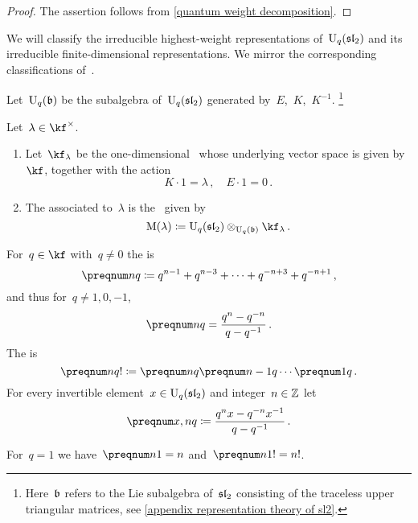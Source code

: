 \documentclass[a4paper, 11pt, oneside]{scrartcl}
\begin{document}
\begin{proof}
  The assertion follows from \cref{quantum weight decomposition}.
\end{proof}

We will classify the irreducible highest-weight representations of~$\operatorname{U}_q(\mathfrak{sl}_2)$ and its irreducible finite-dimensional representations.
We mirror the corresponding classifications of~.

\begin{definition}
  Let~$\operatorname{U}_q(\mathfrak{b})$ be the subalgebra of~$\operatorname{U}_q(\mathfrak{sl}_2)$ generated by~$E$,~$K$,~$K^{-1}$.%
  \footnote{
    Here~$\mathfrak{b}$ refers to the Lie subalgebra of~$\mathfrak{sl}_2$ consisting of the traceless upper triangular matrices, see \cref{appendix representation theory of sl2}.
  }
\end{definition}

\begin{definition}
  Let~$\lambda \in \kf^\times$.
  \begin{enumerate}
    \item
      Let~$\kf_\lambda$ be the one-dimensional~ whose underlying vector space is given by~$\kf$, together with the action
      \[
        K \cdot 1 = \lambda \,,
        \quad
        E \cdot 1 = 0 \,.
      \]
    \item
      The  associated to~$\lambda$ is the~ given by
      \[
        \verma(\lambda)
        \defined
        \Univ_q(\sllie_2) \tensor_{\Univ_q(\blie)} \kf_\lambda \,.
      \]
  \end{enumerate}
\end{definition}

\begin{definition}
  \label{definition of quantum integers}
  For~$q \in \kf$ with~$q \neq 0$ the  is
  \[
    \qnum{n}
    \defined
    q^{n-1} + q^{n-3} + \dotsb + q^{-n+3} + q^{-n+1} \,,
  \]
  and thus for~$q \neq 1, 0, -1$,
  \[
    \qnum{n}
    =
    \frac{q^n - q^{-n}}{q - q^{-1}} \,.
  \]
  The  is
  \[
    \qnum{n}!
    \defined
    \qnum{n} \qnum{n-1} \dotsm \qnum{1} \,.
  \]
  For every invertible element~$x \in \operatorname{U}_q(\mathfrak{sl}_2)$ and integer~$n \in \mathbb{Z}$ let
  \[
    \qnum{x, n}
    \defined
    \frac{ q^n x - q^{-n} x^{-1} }{ q - q^{-1} } \,.
  \]
\end{definition}

\begin{remark}
  For~$q = 1$ we have~$\qnum{n}[1] = n$ and~$\qnum{n}[1]! = n!$.
\end{remark}
\end{document}
